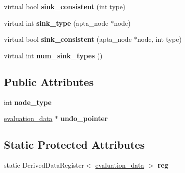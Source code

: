 \begin{DoxyCompactItemize}
\item 
virtual bool {\bfseries sink\+\_\+consistent} (int type)\hypertarget{classevaluation__data_ad3045eb73b3d82d657e808aa33848722}{}\label{classevaluation__data_ad3045eb73b3d82d657e808aa33848722}

\item 
virtual int {\bfseries sink\+\_\+type} (apta\+\_\+node $\ast$node)\hypertarget{classevaluation__data_a185bc8febf0cf0a8bd0a967e911c523c}{}\label{classevaluation__data_a185bc8febf0cf0a8bd0a967e911c523c}

\item 
virtual bool {\bfseries sink\+\_\+consistent} (apta\+\_\+node $\ast$node, int type)\hypertarget{classevaluation__data_abb8607435f006cb15269f252cd18b9da}{}\label{classevaluation__data_abb8607435f006cb15269f252cd18b9da}

\item 
virtual int {\bfseries num\+\_\+sink\+\_\+types} ()\hypertarget{classevaluation__data_ac863fd6a529ba41a87bdeac91cb981fb}{}\label{classevaluation__data_ac863fd6a529ba41a87bdeac91cb981fb}

\end{DoxyCompactItemize}
\subsection*{Public Attributes}
\begin{DoxyCompactItemize}
\item 
int {\bfseries node\+\_\+type}\hypertarget{classevaluation__data_aa0838506c61ba0400cde7cb71bbcf449}{}\label{classevaluation__data_aa0838506c61ba0400cde7cb71bbcf449}

\item 
\hyperlink{classevaluation__data}{evaluation\+\_\+data} $\ast$ {\bfseries undo\+\_\+pointer}\hypertarget{classevaluation__data_a7c72d32aa4dbab4b03838bff5daa7b01}{}\label{classevaluation__data_a7c72d32aa4dbab4b03838bff5daa7b01}

\end{DoxyCompactItemize}
\subsection*{Static Protected Attributes}
\begin{DoxyCompactItemize}
\item 
static Derived\+Data\+Register$<$ \hyperlink{classevaluation__data}{evaluation\+\_\+data} $>$ {\bfseries reg}\hypertarget{classevaluation__data_aab122a205d97fd47be8f59e49804e6de}{}\label{classevaluation__data_aab122a205d97fd47be8f59e49804e6de}

\end{DoxyCompactItemize}


